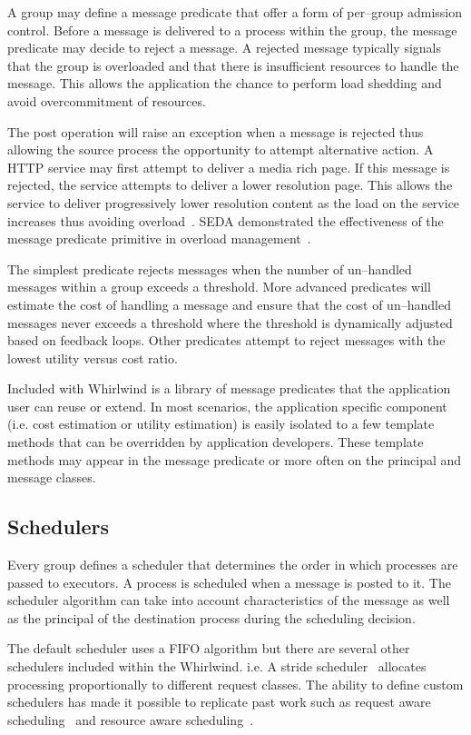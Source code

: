 \documentclass[conference]{IEEEtran}
\begin{document}
A group may define a message predicate that offer a form of per--group admission control. Before a message is delivered to a process within the group, the message predicate may decide to reject a message. A rejected message typically signals that the group is overloaded and that there is insufficient resources to handle the message. This allows the application the chance to perform load shedding and avoid overcommitment of resources.

The post operation will raise an exception when a message is rejected thus allowing the source process the opportunity to attempt alternative action. A HTTP service may first attempt to deliver a media rich page. If this message is rejected, the service attempts to deliver a lower resolution page. This allows the service to deliver progressively lower resolution content as the load on the service increases thus avoiding overload~\cite{abdelzaher99web}. SEDA demonstrated the effectiveness of the message predicate primitive in overload management~\cite{welsh03Adaptive}. 

The simplest predicate rejects messages when the number of un--handled messages within a group exceeds a threshold. More advanced predicates will estimate the cost of handling a message and ensure that the cost of un--handled messages never exceeds a threshold where the threshold is dynamically adjusted based on feedback loops. Other predicates attempt to reject messages with the lowest utility versus cost ratio.

Included with Whirlwind is a library of message predicates that the application user can reuse or extend. In most scenarios, the application specific component (i.e. cost estimation or utility estimation) is easily isolated to a few template methods that can be overridden by application developers. These template methods may appear in the message predicate or more often on the principal and message classes.

\subsection{Schedulers}

Every group defines a scheduler that determines the order in which processes are passed to executors. A process is scheduled when a message is posted to it. The scheduler algorithm can take into account characteristics of the message as well as the principal of the destination process during the scheduling decision.

The default scheduler uses a FIFO algorithm but there are several other schedulers included within the Whirlwind. i.e. A stride scheduler~\cite{Stride:Waldspurger:95} allocates processing proportionally to different request classes. The ability to define custom schedulers has made it possible to replicate past work such as request aware scheduling~\cite{Zhou06RequestAware} and resource aware scheduling~\cite{Behren03Capriccio}.
\end{document}
